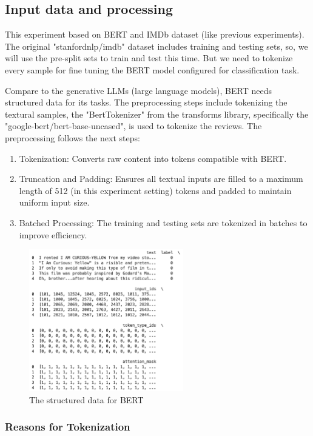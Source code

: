 \subsection{Input data and processing}
This experiment based on BERT and IMDb dataset (like previous experiments). The original "stanfordnlp/imdb" dataset includes training and testing sets, so, we will use the pre-split sets to train and test this time. But we need to tokenize every sample for fine tuning the BERT model configured for classification task.

Compare to the generative LLMs (large language models), BERT needs structured data for its tasks.
The preprocessing steps include tokenizing the textural samples, the "BertTokenizer" from the transforms library, specifically the "google-bert/bert-base-uncased", is used to tokenize the reviews. The preprocessing follows the next steps:

\begin{enumerate}
    \item Tokenization: Converts raw content into tokens compatible with BERT.
    \item Truncation and Padding: Ensures all textual inputs are filled to a maximum length of 512 (in this experiment setting) tokens and padded to maintain uniform input size.
    \item Batched Processing: The training and testing sets are tokenized in batches to improve efficiency.
\end{enumerate}

\begin{figure}[ht]
    \centering
    \includegraphics[width=0.6\textwidth]{pics/bert_data_treate.png}
    \caption{The structured data for BERT}
\end{figure}

\subsubsection*{Reasons for Tokenization}

